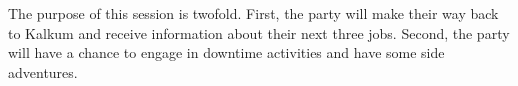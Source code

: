 The purpose of this session is twofold.
First, the party will make their way back to Kalkum and receive information about their next three jobs.
Second, the party will have a chance to engage in downtime activities and have some side adventures.
